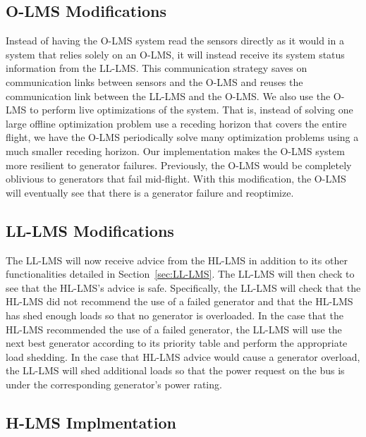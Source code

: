 \documentclass{acm_proc_article-sp}
\begin{document}
\subsection{O-LMS Modifications}
Instead of having the O-LMS system read the sensors directly as it would in a system that relies solely on an O-LMS, it will instead receive its system 
status information from the LL-LMS. This communication strategy saves on communication links between sensors and the O-LMS and reuses the communication
link between the LL-LMS and the O-LMS. We also use the O-LMS to perform live optimizations of the system. That is, instead of solving one large offline
optimization problem use a receding horizon that covers the entire flight, we have the O-LMS periodically solve many optimization problems using a much
smaller receding horizon. Our implementation makes the O-LMS system more resilient to generator failures. Previously, the O-LMS would be completely
oblivious to generators that fail mid-flight. With this modification, the O-LMS will eventually see that there is a generator failure and reoptimize.

\subsection{LL-LMS Modifications}
The LL-LMS will now receive advice from the HL-LMS in addition to its other functionalities detailed in Section~\ref{sec:LL-LMS}. The LL-LMS will then
check to see that the HL-LMS's advice is safe. Specifically, the LL-LMS will check that the HL-LMS did not recommend the use of a failed generator and that
the HL-LMS has shed enough loads so that no generator is overloaded. In the case that the HL-LMS recommended the use of a failed generator, the LL-LMS
will use the next best generator according to its priority table and perform the appropriate load shedding. In the case that HL-LMS advice would cause a
generator overload, the LL-LMS will shed additional loads so that the power request on the bus is under the corresponding generator's power rating.

\subsection{H-LMS Implmentation}
\end{document}

